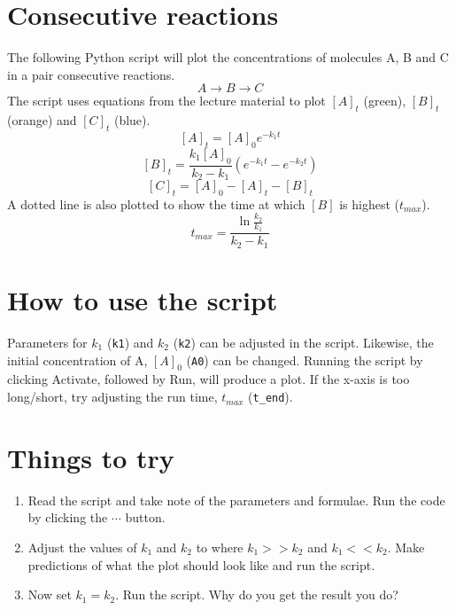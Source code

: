 \documentclass{article}
\begin{document}
\section{Consecutive reactions}

The following Python script will plot the concentrations of molecules A, B and C in a pair consecutive reactions.
$$A\longrightarrow B\longrightarrow C$$
The script uses equations from the lecture material to plot $[A]_t$ (green), $[B]_t$ (orange) and $[C]_t$ (blue).
\[[A]_t = [A]_0e^{-k_1t}\]
\[[B]_t = \frac{k_1[A]_0}{k_2-k_1}(e^{-k_1t}-e^{-k_2t})\]
\[[C]_t = [A]_0-[A]_t-[B]_t\]
A dotted line is also plotted to show the time at which $[B]$ is highest ($t_{max}$).
\[t_{max} = \frac{\ln \frac{k_2}{k_1}}{k_2-k_1}\]

\section{How to use the script}
Parameters for $k_1$ (\texttt{k1}) and $k_2$ (\texttt{k2}) can be adjusted in the script. Likewise, the initial concentration of A, $[A]_0$ (\texttt{A0}) can be changed. Running the script by clicking Activate, followed by Run, will produce a plot. If the x-axis is too long/short, try adjusting the run time, $t_{max}$ (\texttt{t\_end}).

\section{Things to try}
\begin{enumerate}
\item Read the script and take note of the parameters and formulae. Run the code by clicking the $\cdots$ button.
\item Adjust the values of $k_1$ and $k_2$ to where $k_1>>k_2$ and $k_1<<k_2$. Make predictions of what the plot should look like and run the script.
\item Now set $k_1=k_2$. Run the script. Why do you get the result you do?
\end{enumerate}
\end{document}
